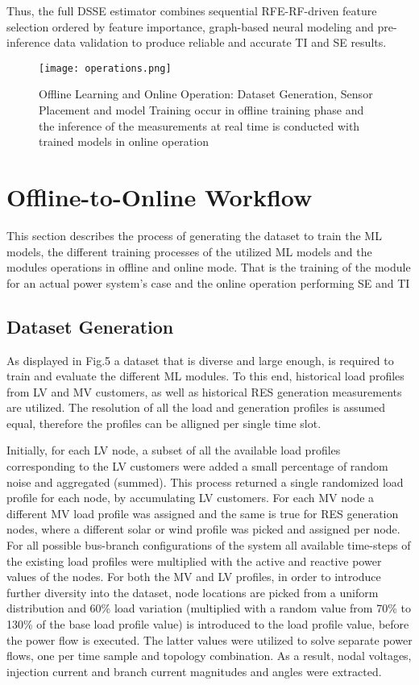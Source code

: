 \documentclass[journal]{IEEEtran}  %
\begin{document}
Thus, the full DSSE estimator combines sequential RFE-RF-driven feature selection ordered by feature importance, graph-based neural modeling and pre-inference data validation to produce reliable and accurate TI and SE results.

\begin{figure}[h!]
  \centering
  \texttt{[image: operations.png]}
  \caption{Offline Learning and Online Operation: Dataset Generation, Sensor Placement and model Training occur in offline training phase and the inference of the measurements at real time is conducted with trained models in online operation}
  \label{fig:GNN-image}
\end{figure}

\section{Offline-to-Online Workflow}
This section describes the process of generating the dataset to train the ML models, the different training processes of the utilized ML models and the modules operations in offline and online mode. That is the training of the module for an actual power system's case and the online operation performing SE and TI

\subsection{Dataset Generation}
As displayed in Fig.5 a dataset that is diverse and large enough, is required to train and evaluate the different ML modules. To this end, historical load profiles from LV and MV customers, as well as historical RES generation measurements are utilized. The resolution of all the load and generation profiles is assumed equal, therefore the profiles can be alligned per single time slot.

Initially, for each LV node, a subset of all the available load profiles corresponding to the LV customers were added a small percentage of random noise and aggregated (summed). This process returned a single randomized load profile for each node, by accumulating LV customers. For each MV node a different MV load profile was assigned and the same is true for RES generation nodes, where a different solar or wind profile was picked and assigned per node. For all possible bus-branch configurations of the system all available time-steps of the existing load profiles were multiplied with the active and reactive power values of the nodes. For both the MV and LV profiles, in order to introduce further diversity into the dataset, node locations are picked from a uniform distribution and 60\% load variation (multiplied with a random value from 70\% to 130\% of the base load profile value) is introduced to the load profile value, before the power flow is executed. The latter values were utilized to solve separate power flows, one per time sample and topology combination. As a result, nodal voltages, injection current and branch current magnitudes and angles were extracted.
\end{document}
